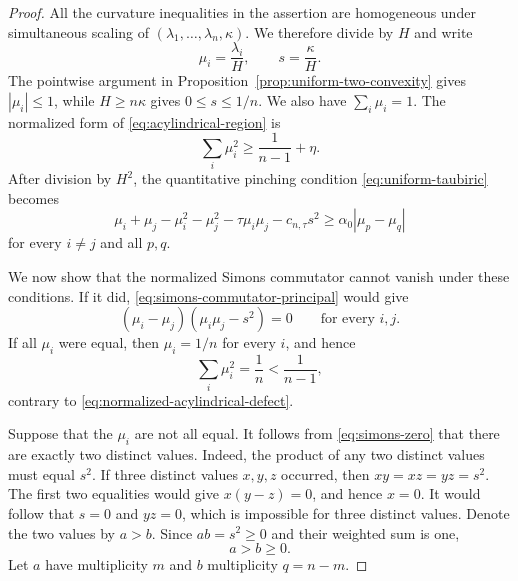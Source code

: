 \documentclass[11pt,reqno]{amsart}
\theoremstyle{definition}
\theoremstyle{remark}
\numberwithin{equation}{section}
\begin{document}
\begin{proof}
All the curvature inequalities in the assertion are homogeneous under
simultaneous scaling of
$(\lambda_1,\ldots,\lambda_n,\kappa)$.  We therefore divide by $H$ and write
\begin{equation*}
 \mu_i=\frac{\lambda_i}{H},
 \qquad
 s=\frac{\kappa}{H}.
\end{equation*}
The pointwise argument in Proposition~\ref{prop:uniform-two-convexity} gives
$|\mu_i|\leq1$, while $H\geq n\kappa$ gives $0\leq s\leq1/n$.  We also have
$\sum_i\mu_i=1$.  The normalized form of
\eqref{eq:acylindrical-region} is
\begin{equation}\label{eq:normalized-acylindrical-defect}
 \sum_i\mu_i^2\geq\frac1{n-1}+\eta.
\end{equation}
After division by $H^2$, the quantitative pinching condition \eqref{eq:uniform-taubiric} becomes
\begin{equation}\label{eq:normalized-tau-pinching}
 \mu_i+\mu_j-\mu_i^2-\mu_j^2-\tau\mu_i\mu_j
 -c_{n,\tau}s^2
 \geq\alpha_0|\mu_p-\mu_q|
\end{equation}
for every $i\ne j$ and all $p,q$.

We now show that the normalized Simons commutator cannot vanish under these
conditions.  If it did, \eqref{eq:simons-commutator-principal} would give
\begin{equation}\label{eq:simons-zero}
 (\mu_i-\mu_j)(\mu_i\mu_j-s^2)=0
 \qquad\text{for every }i,j.
\end{equation}
If all $\mu_i$ were equal, then
$\mu_i=1/n$ for every $i$, and hence
\begin{equation*}
 \sum_i\mu_i^2=\frac1n<\frac1{n-1},
\end{equation*}
contrary to \eqref{eq:normalized-acylindrical-defect}.

Suppose that the $\mu_i$ are not all equal.  It follows from
\eqref{eq:simons-zero} that there are exactly two distinct values.
Indeed, the product of any two distinct values must equal $s^2$.  If three
distinct values $x,y,z$ occurred, then $xy=xz=yz=s^2$.  The first two
equalities would give $x(y-z)=0$, and hence $x=0$.  It would follow that
$s=0$ and $yz=0$, which is impossible for three distinct values.  Denote the
two values by $a>b$.  Since $ab=s^2\geq0$ and their weighted sum is one,
\begin{equation*}
 a>b\geq0.
\end{equation*}
Let $a$ have multiplicity $m$ and $b$ multiplicity $q=n-m$.


\end{proof}
\end{document}
